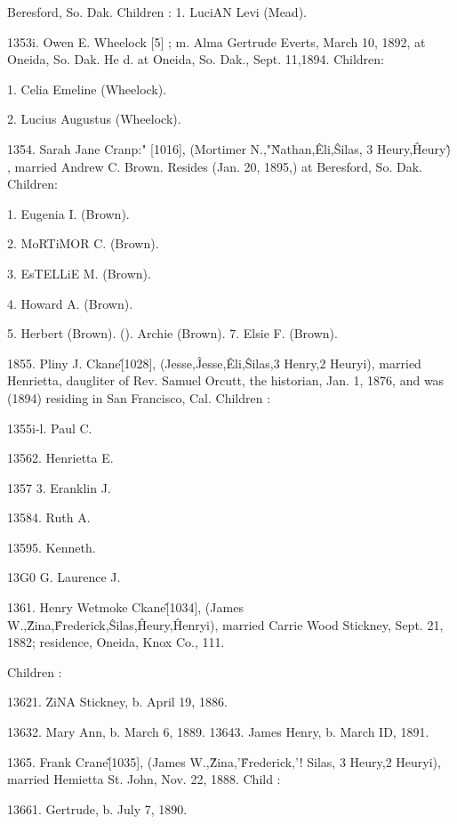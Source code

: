 \documentclass{book}
\begin{document}
Beresford, So. Dak. Children : 
1. LuciAN Levi (Mead). 

1353i. Owen E. Wheelock [5] ; m. Alma Gertrude Everts, March 10, 
1892, at Oneida, So. Dak. He d. at Oneida, So. Dak., Sept. 
11,1894. Children: 

1. Celia Emeline (Wheelock). 

2. Lucius Augustus (Wheelock). 

1354. Sarah Jane Cranp:" [1016], (Mortimer N.,"\^ Nathan,\^ 
Eli,\^ Silas, 3 Heury,\^ Heury\^) , married Andrew C. Brown. Resides 
(Jan. 20, 1895,) at Beresford, So. Dak. Children: 

1. Eugenia I. (Brown). 

2. MoRTiMOR C. (Brown). 

3. EsTELLiE M. (Brown). 

4. Howard A. (Brown). 

5. Herbert (Brown). 
(). Archie (Brown). 
7. Elsie F. (Brown). 

1855. Pliny J. Ckane\^ [1028], (Jesse,\^ Jesse,\^ Eli,\^ Silas,3 
Henry,2 Heuryi), married Henrietta, daugliter of Rev. Samuel 
Orcutt, the historian, Jan. 1, 1876, and was (1894) residing in 
San Francisco, Cal. Children : 

1355i-l. Paul C. 

13562. Henrietta E. 

1357  3. Eranklin J. 

13584. Ruth A. 

13595. Kenneth. 

13G0 G. Laurence J. 

1361. Henry Wetmoke Ckane\^ [1034], (James W.,\^ Zina,\^ 
Frederick,\^ Silas,\^ Heury,\^ Henryi), married Carrie Wood 
Stickney, Sept. 21, 1882; residence, Oneida, Knox Co., 111. 

Children : 

13621. ZiNA Stickney, b. April 19, 1886. 




13632. Mary Ann, b. March 6, 1889. 
13643. James Henry, b. March ID, 1891. 

1365. Frank Crane\^ [1035], (James W.,\^ Zina,'\^ Frederick,'! 
Silas, 3 Heury,2 Heuryi), married Hemietta St. John, Nov. 22, 
1888. Child : 

13661. Gertrude, b. July 7, 1890. 
\end{document}
